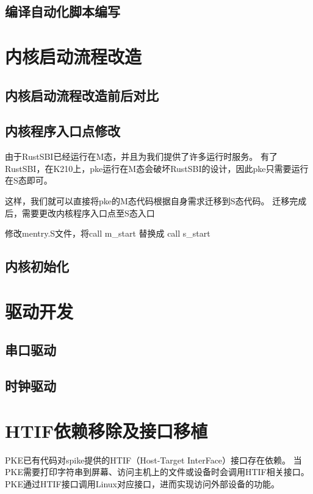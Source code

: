 \subsection{编译自动化脚本编写}

\section{内核启动流程改造}

\subsection{内核启动流程改造前后对比}

\subsection{内核程序入口点修改}

由于RustSBI已经运行在M态，并且为我们提供了许多运行时服务。
有了RustSBI，在K210上，pke运行在M态会破坏RustSBI的设计，因此pke只需要运行在S态即可。

这样，我们就可以直接将pke的M态代码根据自身需求迁移到S态代码。
迁移完成后，需要更改内核程序入口点至S态入口

修改mentry.S文件，将call m\_start 替换成 call s\_start

\subsection{内核初始化}

\section{驱动开发}

\subsection{串口驱动}

\subsection{时钟驱动}

\section{HTIF依赖移除及接口移植}

PKE已有代码对spike提供的HTIF（Host-Target InterFace）接口存在依赖。
当PKE需要打印字符串到屏幕、访问主机上的文件或设备时会调用HTIF相关接口。
PKE通过HTIF接口调用Linux对应接口，进而实现访问外部设备的功能。

